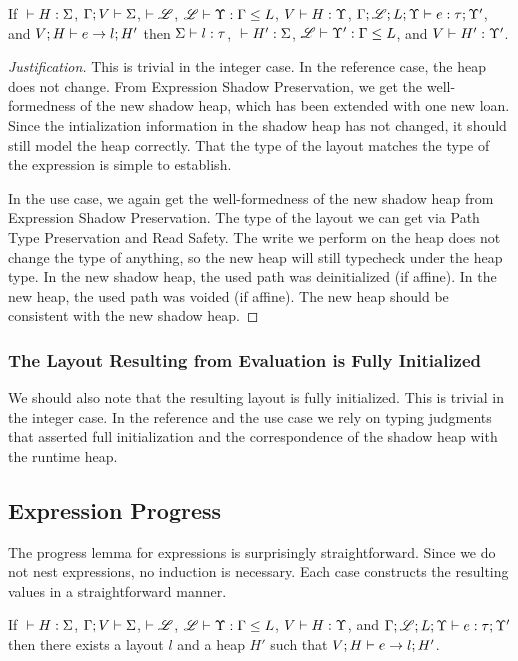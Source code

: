 \begin{conj}
  \raggedright
  If ${} \vdash {H} : {\Sigma}$, $\Gamma;V\vdash\Sigma$, $\vdash\mathscr{L}$, ${\mathscr{L}} \vdash {\Upsilon} : {\Gamma} \leq {L}$, 
  ${V} \vdash {H} : {\Upsilon}$, ${\Gamma;\mathscr{L};L;\Upsilon} \vdash {e} : {\tau;\Upsilon'}$, and ${V;H} \vdash {e} \to {l;H'}$
  then ${\Sigma} \vdash {l} : {\tau}$, ${} \vdash {H'} : {\Sigma}$, ${\mathscr{L}} \vdash {\Upsilon'} : {\Gamma} \leq {L}$, and ${V} \vdash {H'} : {\Upsilon'}$.
\end{conj}

\begin{proof}[Justification]
  This is trivial in the integer case.
  In the reference case, the heap does not change.
  From Expression Shadow Preservation, we get the well-formedness of the new shadow heap,
  which has been extended with one new loan. Since the intialization information in the shadow
  heap has not changed, it should still model the heap correctly.
  That the type of the layout matches the type of the expression is simple to establish.

  In the use case, we again get the well-formedness of the new shadow heap from
  Expression Shadow Preservation. The type of the layout we can get via 
  Path Type Preservation and Read Safety. The write we perform on the heap
  does not change the type of anything, so the new heap will still typecheck under the heap type.
  In the new shadow heap, the used path was deinitialized (if affine).
  In the new heap, the used path was voided (if affine).
  The new heap should be consistent with the new shadow heap.
\end{proof}

\subsubsection*{The Layout Resulting from Evaluation is Fully Initialized}
We should also note that the resulting layout is fully initialized.
This is trivial in the integer case. In the reference and the use case
we rely on typing judgments that asserted full initialization and the correspondence
of the shadow heap with the runtime heap.

\subsection*{Expression Progress}
The progress lemma for expressions is surprisingly straightforward.
Since we do not nest expressions, no induction is necessary.
Each case constructs the resulting values in a straightforward manner.

\begin{conj}
  \raggedright
  If ${} \vdash {H} : {\Sigma}$, $\Gamma;V\vdash\Sigma$, $\vdash\mathscr{L}$, ${\mathscr{L}} \vdash {\Upsilon} : {\Gamma} \leq {L}$,
  ${V} \vdash {H} : {\Upsilon}$, and ${\Gamma;\mathscr{L};L;\Upsilon} \vdash {e} : {\tau;\Upsilon'}$
  then there exists a layout $l$ and a heap $H'$ such that ${V;H} \vdash {e} \to {l;H'}$.
\end{conj}

